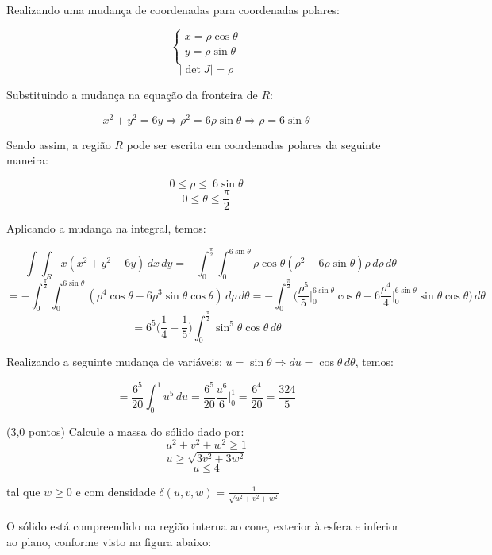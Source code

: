 \documentclass[12pt,a4paper]{article}
\begin{document}
Realizando uma mudança de coordenadas para coordenadas polares:

$$
\left\{
\begin{array}{lc}
x = \rho \cos \theta\\
y = \rho \sin \theta \\
\end{array}
\right.
$$
$$ | \det J | = \rho $$

Substituindo a mudança na equação da fronteira de $R$:

$$ x^2 + y^2 = 6y \Rightarrow \rho^2 = 6 \rho \sin \theta \Rightarrow \rho = 6 \sin \theta $$

Sendo assim, a região $R$ pode ser escrita em coordenadas polares da seguinte maneira:

$$ 0 \leq \rho \leq  \ 6 \sin \theta $$
$$ 0 \leq \theta \leq \frac{\pi}{2} $$

Aplicando a mudança na integral, temos:


$$- \int \int_R x (x^2 + y^2 - 6y) \,dx \,dy  = - \int_0^{\frac{\pi}{2}} \int_0^{6 \sin \theta} \rho \cos \theta ( \rho^2 - 6 \rho \sin \theta ) \rho \,d\rho
 \,d\theta $$
 $$ =  - \int_0^{\frac{\pi}{2}} \int_0^{6 \sin \theta} ( \rho^4 \cos \theta - 6 \rho^3 \sin \theta \cos \theta ) \,d\rho
 \,d\theta = - \int_0^{\frac{\pi}{2}}  \Big( \frac{\rho^5}{5} \Big|_0^{6 \sin \theta} \cos \theta - 6 \frac{\rho^4}{4} \Big|_0^{6 \sin \theta} \sin \theta \cos \theta \Big) 
 \,d\theta  $$
 $$ = 6^5 \Big( \frac{1}{4} - \frac{1}{5} \Big) \int_0^{\frac{\pi}{2}} \sin^5 \theta \cos \theta \,d\theta  $$
 
 Realizando a seguinte mudança de variáveis: $u = \sin \theta \Rightarrow du = \cos \theta \,d\theta $, temos:
 
$$ = \frac{6^5}{20} \int_0^1 u^5 \,du = \frac{6^5}{20} \frac{u^6}{6} \Big|_0^1 = \frac{6^4}{20} = \frac{324}{5}$$

\newpage
{}
(3,0 pontos) Calcule a massa do sólido dado por:
$$u^2+v^2+w^2 \geq 1$$
$$u \geq \sqrt{3v^2+3w^2}$$
$$u\leq 4$$

tal que $w\geq 0$ e com densidade $\displaystyle{\delta(u,v,w)=\frac{1}{\sqrt{u^2+v^2+w^2}}}$\\
\\

O sólido está compreendido na região interna ao cone, exterior à esfera e inferior ao plano, conforme visto na figura abaixo:
\end{document}
